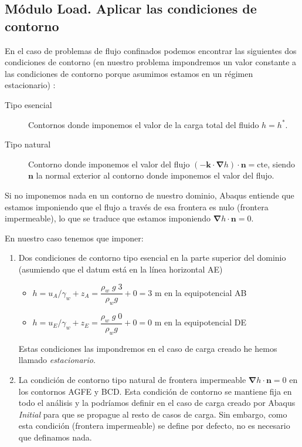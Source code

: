   \subsection{Módulo Load. Aplicar las condiciones de contorno}

  En el caso de problemas de flujo confinados podemos encontrar las
  siguientes dos condiciones de contorno (en nuestro problema
  impondremos un valor constante a las condiciones de contorno porque
  asumimos estamos en un régimen estacionario) :
  \begin{description}
  \item[Tipo esencial] Contornos donde imponemos el valor de la carga
    total del fluido $h=h^*$.
  \item[Tipo natural] Contorno donde imponemos el valor del flujo
    $(-\textbf{k}\cdot\bm{\nabla}h)\cdot\textbf{n}=\mathrm{cte}$,
    siendo $\textbf{n}$ la normal exterior al contorno donde imponemos
    el valor del flujo.
  \end{description}

  Si no imponemos nada en un contorno de nuestro dominio, Abaqus
  entiende que estamos imponiendo que el flujo a través de esa
  frontera es nulo (frontera impermeable), lo que se traduce que
  estamos imponiendo $ \bm{\nabla}h\cdot\textbf{n}=0$.

  En nuestro caso tenemos que imponer:
  \begin{enumerate}
  \item Dos condiciones de contorno tipo esencial en la parte
    superior del dominio (asumiendo que el datum está en la línea
    horizontal AE)
    \begin{itemize}
    \item $h=u_A/\gamma_w+z_A=\dfrac{\rho_w\; g\; 3}{\rho_w g}+0 = 3$
      m en la equipotencial AB
    \item $h=u_E/\gamma_w+z_E= \dfrac{\rho_w\; g\; 0}{\rho_w g}+0=0$ m
      en la equipotencial DE
    \end{itemize}
    Estas condiciones las impondremos en el caso de carga creado he
    hemos llamado \textit{estacionario}.
  \item La condición de contorno tipo natural de frontera impermeable $
    \bm{\nabla}h\cdot\textbf{n}=0$ en los contornos AGFE y BCD. Esta
    condición de contorno se mantiene fija en todo el análisis y la
    podríamos definir en el caso de carga creado por Abaqus
    \textit{Initial} para que se propague al resto de casos de
    carga. Sin embargo, como esta condición (frontera impermeable) se
    define por defecto, no es necesario que definamos nada.
  \end{enumerate}

